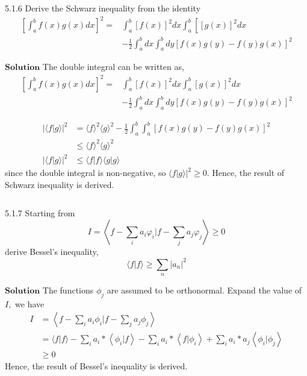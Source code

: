 \newpage


\begin{mybox}{5.1.6}
Derive the Schwarz inequality from the identity
$$
\begin{aligned}
\left[\int_{a}^{b} f(x) g(x) d x\right]^{2}=& \int_{a}^{b}[f(x)]^{2} d x \int_{a}^{b}\left[[g(x)]^{2} d x\right.\\
&-\frac{1}{2} \int_{a}^{b} d x \int_{a}^{b} d y[f(x) g(y)-f(y) g(x)]^{2}
\end{aligned}
$$
\end{mybox}

$\boxed{\textbf{Solution}}$ The double integral can be written as,
$$
\begin{aligned}
\left[\int_{a}^{b} f(x) g(x) d x\right]^{2}=& \int_{a}^{b}[f(x)]^{2} d x \int_{a}^{b}[g(x)]^{2} d x \\
&-\frac{1}{2} \int_{a}^{b} d x \int_{a}^{b} d y[f(x) g(y)-f(y) g(x)]^{2}
\end{aligned}
$$

$$
\begin{aligned}
|\langle f | g\rangle|^{2} &=\langle f\rangle^{2}\langle g\rangle^{2}-\frac{1}{2} \int_{a}^{b} \int_{a}^{b}[f(x) g(y)-f(y) g(x)]^{2} \\
& \leq\langle f\rangle^{2}\langle g\rangle^{2} \\
|\langle f | g\rangle|^{2} & \leq\langle f | f\rangle\langle g | g\rangle
\end{aligned}
$$
since the double integral is non-negative, so $\left.\langle f | g\rangle\right|^{2} \geq 0$.
Hence, the result of Schwarz inequality is derived.

$$$$


\begin{mybox}{5.1.7}
Starting from 
$$I=\left\langle f-\sum_{i} a_{i} \varphi_{i} | f-\sum_{j} a_{j} \varphi_{j}\right\rangle \geq 0$$
derive Bessel's inequality, 
$$\langle f | f\rangle \geq \sum_{n}\left|a_{n}\right|^{2}$$
\end{mybox}

$\boxed{\textbf{Solution}}$ The functions $\phi_{j}$ are assumed to be orthonormal.
Expand the value of $I,$ we have
$$\begin{aligned} I &=\left\langle f-\sum_{i} a_{i} \phi_{i} | f-\sum_{j} a_{j} \phi_{j}\right\rangle \\ &=\langle f | f\rangle-\sum_{i} a_{i} *\left\langle\phi_{i} | f\right\rangle-\sum_{i} a_{i} *\left\langle f | \phi_{i}\right\rangle+\sum_{i} a_{i} * a_{j}\left\langle\phi_{i} | \phi_{j}\right\rangle \\ & \geq 0 \end{aligned}$$
Hence, the result of Bessel's inequality is derived.

